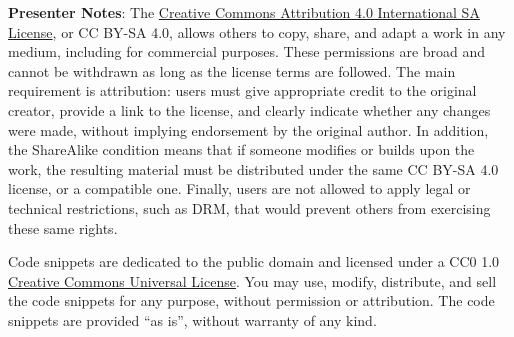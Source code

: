 \documentclass[
  letterpaper,
  DIV=11,
  numbers=noendperiod]{scrartcl}
\begin{document}
\textbf{Presenter Notes}: The
\href{https://creativecommons.org/licenses/by-sa/4.0/deed.en}{Creative
Commons Attribution 4.0 International SA License}, or CC BY-SA 4.0,
allows others to copy, share, and adapt a work in any medium, including
for commercial purposes. These permissions are broad and cannot be
withdrawn as long as the license terms are followed. The main
requirement is attribution: users must give appropriate credit to the
original creator, provide a link to the license, and clearly indicate
whether any changes were made, without implying endorsement by the
original author. In addition, the ShareAlike condition means that if
someone modifies or builds upon the work, the resulting material must be
distributed under the same CC BY-SA 4.0 license, or a compatible one.
Finally, users are not allowed to apply legal or technical restrictions,
such as DRM, that would prevent others from exercising these same
rights.

Code snippets are dedicated to the public domain and licensed under a
CC0 1.0
\href{https://creativecommons.org/publicdomain/zero/1.0/}{Creative
Commons Universal License}. You may use, modify, distribute, and sell
the code snippets for any purpose, without permission or attribution.
The code snippets are provided ``as is'', without warranty of any kind.
\end{document}
